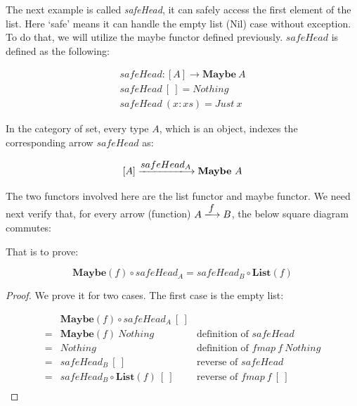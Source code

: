 \documentclass[b5paper]{article}
\begin{document}
\begin{example}
\normalfont
The next example is called \textit{safeHead}, it can safely access the first element of the list. Here `safe' means it can handle the empty list (Nil) case without exception. To do that, we will utilize the maybe functor defined previously. $safeHead$ is defined as the following:

\[
\begin{array}{l}
safeHead : [A] \to \mathbf{Maybe}\ A \\
safeHead\ [\ ] = Nothing \\
safeHead\ (x:xs) = Just\ x
\end{array}
\]

In the category of set, every type $A$, which is an object, indexes the corresponding arrow $safeHead$ as:

\[
[A] \arrowto{safeHead_A} \mathbf{Maybe}\ A
\]

The two functors involved here are the list functor and maybe functor. We need next verify that, for every arrow (function) $A \arrowto{f} B$, the below square diagram commutes:

\begin{center}
\end{center}

That is to prove:

\[
  \mathbf{Maybe}(f) \circ safeHead_A = safeHead_B \circ \mathbf{List}(f)
\]

\begin{proof}
We prove it for two cases. The first case is the empty list:

\[
\begin{array}{cll}
  & \mathbf{Maybe}(f) \circ safeHead_A\ [\ ] & \\
= & \mathbf{Maybe}(f)\ Nothing & \text{definition of $safeHead$} \\
= & Nothing & \text{definition of $fmap\ f\ Nothing$} \\
= & safeHead_B\ [\ ] & \text{reverse of $safeHead$} \\
= & safeHead_B \circ \mathbf{List}(f)\ [\ ] & \text{reverse of $fmap\ f\ [\ ]$} \\
\end{array}
\]


\end{proof}
\end{example}
\end{document}
